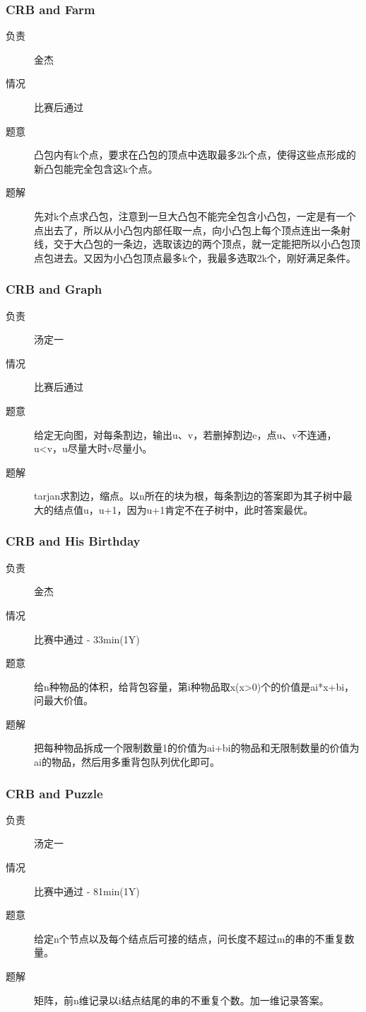 \documentclass[a4paper, 11pt, nofonts, nocap, fancyhdr]{ctexart}
\newcommand{\problem}[1]{\subsubsection{#1}}
\begin{document}
\problem{CRB and Farm}

\begin{description}
\item[负责] 金杰
\item[情况] 比赛后通过
\item[题意]
凸包内有k个点，要求在凸包的顶点中选取最多2k个点，使得这些点形成的新凸包能完全包含这k个点。
\item[题解]
先对k个点求凸包，注意到一旦大凸包不能完全包含小凸包，一定是有一个点出去了，所以从小凸包内部任取一点，向小凸包上每个顶点连出一条射线，交于大凸包的一条边，选取该边的两个顶点，就一定能把所以小凸包顶点包进去。又因为小凸包顶点最多k个，我最多选取2k个，刚好满足条件。
\end{description}

\problem{CRB and Graph}%

\begin{description}
\item[负责] 汤定一
\item[情况] 比赛后通过
\item[题意]
给定无向图，对每条割边，输出u、v，若删掉割边e，点u、v不连通，u<v，u尽量大时v尽量小。
\item[题解]
tarjan求割边，缩点。以n所在的块为根，每条割边的答案即为其子树中最大的结点值u，u+1，因为u+1肯定不在子树中，此时答案最优。
\end{description}

\problem{CRB and His Birthday}

\begin{description}
\item[负责] 金杰
\item[情况] 比赛中通过 - 33min(1Y)
\item[题意]
给n种物品的体积，给背包容量，第i种物品取x(x>0)个的价值是ai*x+bi，问最大价值。
\item[题解]
把每种物品拆成一个限制数量1的价值为ai+bi的物品和无限制数量的价值为ai的物品，然后用多重背包队列优化即可。
\end{description}

\problem{CRB and Puzzle}%

\begin{description}
\item[负责] 汤定一
\item[情况] 比赛中通过 - 81min(1Y)
\item[题意]
给定n个节点以及每个结点后可接的结点，问长度不超过m的串的不重复数量。
\item[题解]
矩阵，前n维记录以i结点结尾的串的不重复个数。加一维记录答案。
\end{description}
\end{document}
